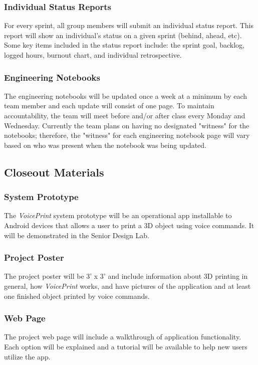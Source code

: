 \subsubsection{Individual Status Reports}
For every sprint, all group members will submit an individual status report. This report will show an individual's status on a given sprint (behind, ahead, etc). Some key items included in the status report include: the sprint goal, backlog, logged hours, burnout chart, and individual retrospective.

\subsubsection{Engineering Notebooks}
The engineering notebooks will be updated once a week at a minimum by each team member and each update will consist of one page. To maintain accountability, the team will meet before and/or after class every Monday and Wednesday. Currently the team plans on having no designated "witness" for the notebooks; therefore, the "witness" for each engineering notebook page will vary based on who was present when the notebook was being updated.

\subsection{Closeout Materials}

\subsubsection{System Prototype}
The \textit{VoicePrint} system prototype will be an operational app installable to Android devices that allows a user to print a 3D object using voice commands. It will be demonstrated in the Senior Design Lab.

\subsubsection{Project Poster}
The project poster will be 3' x 3' and include information about 3D printing in general, how \textit{VoicePrint} works, and have pictures of the application and at least one finished object printed by voice commands.

\subsubsection{Web Page}
The project web page will include a walkthrough of application functionality. Each option will be explained and a tutorial will be available to help new users utilize the app.

